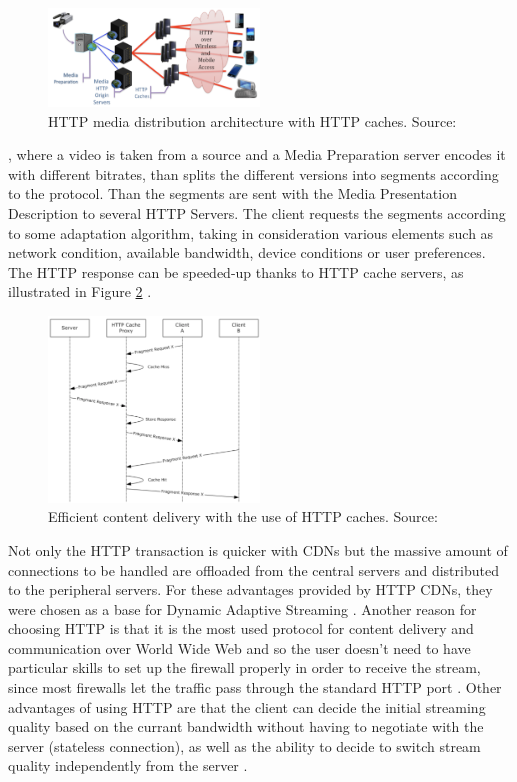 \documentclass[openany]{book}
\begin{document}
\begin{figure}[ht]
\centering
\includegraphics[width=0.5\textwidth]{architecture.png}
\caption{\label{fig:architecture}HTTP media distribution architecture with HTTP caches. Source: \cite{DASH2}}
\end{figure}, where a video is taken from a source and a Media Preparation server encodes it with different bitrates, than splits the different versions into segments according to the protocol. Than the segments are sent with the Media Presentation Description to several HTTP Servers. The client requests the segments according to some adaptation algorithm, taking in consideration various elements such as network condition, available bandwidth, device conditions or user preferences. The HTTP response can be speeded-up thanks to HTTP cache servers, as illustrated in Figure \ref{fig:caching} \cite{DASH1, DASH2, MS}.
\begin{figure}[ht]
\centering
\includegraphics[width=0.5\textwidth]{caching.png}
\caption{\label{fig:caching}Efficient content delivery with the use of HTTP caches. Source: \cite{MS}}
\end{figure}
Not only the HTTP transaction is quicker with CDNs but the massive amount of connections to be handled are offloaded from the central servers and distributed to the peripheral servers. For these advantages provided by HTTP CDNs, they were chosen as a base for Dynamic Adaptive Streaming \cite{DASH2}. 
Another reason for choosing HTTP is that it is the most used protocol for content delivery and communication over World Wide Web and so the user doesn't need to have particular skills to set up the firewall properly in order to receive the stream, since most firewalls let the traffic pass through the standard HTTP port \cite{DASH1, DASH2}. 
Other advantages of using HTTP are that the client can decide the initial streaming quality based on the currant bandwidth without having to negotiate with the server \cite{DASH2} (stateless  connection), as well as the ability to decide to switch stream quality independently from the server \cite{DASH2}.
\end{document}
